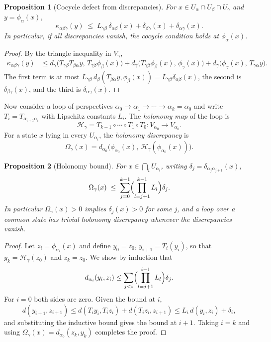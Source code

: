 \documentclass[11pt]{article}
\newtheorem{proposition}{Proposition}
\theoremstyle{remark}
\begin{document}
\begin{proposition}[Cocycle defect from discrepancies]\label{prop:cocycle}
For $x\in U_\alpha\cap U_\beta\cap U_\gamma$ and $y=\phi_\alpha(x)$,
\[
\kappa_{\alpha\beta\gamma}(y)\;\le\;L_{\gamma\beta}\,\delta_{\alpha\beta}(x)+\delta_{\beta\gamma}(x)+\delta_{\alpha\gamma}(x).
\]
In particular, if all discrepancies vanish, the cocycle condition holds at $\phi_\alpha(x)$.
\end{proposition}

\begin{proof}
By the triangle inequality in $V_\gamma$,
\begin{align*}
\kappa_{\alpha\beta\gamma}(y)
&\le d_\gamma\bigl(T_{\gamma\beta}T_{\beta\alpha}y,\,T_{\gamma\beta}\phi_\beta(x)\bigr)
+d_\gamma\bigl(T_{\gamma\beta}\phi_\beta(x),\,\phi_\gamma(x)\bigr)
+d_\gamma\bigl(\phi_\gamma(x),\,T_{\gamma\alpha}y\bigr).
\end{align*}
The first term is at most $L_{\gamma\beta}\,d_\beta(T_{\beta\alpha}y,\phi_\beta(x))=L_{\gamma\beta}\delta_{\alpha\beta}(x)$, the second is $\delta_{\beta\gamma}(x)$, and the third is $\delta_{\alpha\gamma}(x)$.
\end{proof}

Now consider a loop of perspectives $\alpha_0\to\alpha_1\to\cdots\to\alpha_k=\alpha_0$ and write $T_i=T_{\alpha_{i+1}\alpha_i}$ with Lipschitz constants $L_i$. The \emph{holonomy map} of the loop is
\[
\mathcal H_\gamma=T_{k-1}\circ\cdots\circ T_1\circ T_0:V_{\alpha_0}\to V_{\alpha_0}.
\]
For a state $x$ lying in every $U_{\alpha_i}$, the \emph{holonomy discrepancy} is
\[
\Omega_\gamma(x)=d_{\alpha_0}\bigl(\phi_{\alpha_0}(x),\,\mathcal H_\gamma(\phi_{\alpha_0}(x))\bigr).
\]

\begin{proposition}[Holonomy bound]\label{prop:holbound}
For $x\in\bigcap_{i}U_{\alpha_i}$, writing $\delta_j=\delta_{\alpha_j\alpha_{j+1}}(x)$,
\[
\Omega_\gamma(x)\;\le\;\sum_{j=0}^{k-1}\Bigl(\prod_{l=j+1}^{k-1}L_l\Bigr)\delta_j .
\]
In particular $\Omega_\gamma(x)>0$ implies $\delta_j(x)>0$ for some $j$, and a loop over a common state has trivial holonomy discrepancy whenever the discrepancies vanish.
\end{proposition}

\begin{proof}
Let $z_i=\phi_{\alpha_i}(x)$ and define $y_0=z_0$, $y_{i+1}=T_i(y_i)$, so that $y_k=\mathcal H_\gamma(z_0)$ and $z_k=z_0$. We show by induction that
\[
d_{\alpha_i}(y_i,z_i)\le\sum_{j<i}\Bigl(\prod_{l=j+1}^{i-1}L_l\Bigr)\delta_j .
\]
For $i=0$ both sides are zero. Given the bound at $i$,
\[
d(y_{i+1},z_{i+1})\le d(T_iy_i,T_iz_i)+d(T_iz_i,z_{i+1})\le L_i\,d(y_i,z_i)+\delta_i,
\]
and substituting the inductive bound gives the bound at $i+1$. Taking $i=k$ and using $\Omega_\gamma(x)=d_{\alpha_0}(z_k,y_k)$ completes the proof.
\end{proof}
\end{document}
